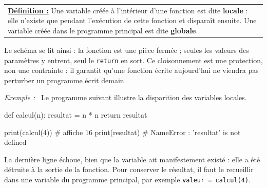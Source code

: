 \documentclass[a4paper,11pt,openany]{book}
\newcommand{\mot}[1]{\textcolor{rougecours}{\textbf{#1}}}
\newcommand{\code}[1]{\texttt{\textcolor{codebleu}{#1}}}
\newenvironment{exemple}%
 {\par\vspace{1mm}\begin{list}{}{\leftmargin=1cm \rightmargin=0.5cm}\item[]%
  \textit{Exemple :}~}%
 {\end{list}\vspace{1mm}}
\begin{document}
\begin{center}
\begin{tabularx}{15cm}{||X}
\noindent \textbf{\underline{Définition :}} Une variable créée à l'intérieur d'une fonction est dite \mot{locale} : elle n'existe que pendant l'exécution de cette fonction et disparaît ensuite. Une variable créée dans le programme principal est dite \mot{globale}.
\end{tabularx}
\end{center}

\begin{center}
\end{center}

Le schéma se lit ainsi : la fonction est une pièce fermée ; seules les valeurs des paramètres y entrent, seul le \code{return} en sort. Ce cloisonnement est une protection, non une contrainte : il garantit qu'une fonction écrite aujourd'hui ne viendra pas perturber un programme écrit demain.

\begin{exemple}
Le programme suivant illustre la disparition des variables locales.
\begin{python}
def calcul(n):
    resultat = n * n
    return resultat

print(calcul(4))      # affiche 16
print(resultat)       # NameError : 'resultat' is not defined
\end{python}
La dernière ligne échoue, bien que la variable ait manifestement existé : elle a été détruite à la sortie de la fonction. Pour conserver le résultat, il faut le recueillir dans une variable du programme principal, par exemple \code{valeur = calcul(4)}.
\end{exemple}
\end{document}
